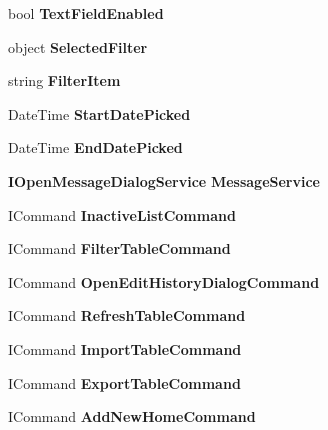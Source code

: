 \begin{DoxyCompactItemize}
\mbox{\label{class_a_f_h___scheduler_1_1_data_v_m_a2e6eb006502aeaff72ad2cb226d83679}} 
bool {\bfseries Text\+Field\+Enabled}\hspace{0.3cm}{\ttfamily  [get, set]}
\item 
\mbox{\label{class_a_f_h___scheduler_1_1_data_v_m_a5326e462e8c421bfda77f64aecdefbe7}} 
object {\bfseries Selected\+Filter}\hspace{0.3cm}{\ttfamily  [get, set]}
\item 
\mbox{\label{class_a_f_h___scheduler_1_1_data_v_m_aa6ab63cf7adfba8c43952d6a47a7331d}} 
string {\bfseries Filter\+Item}\hspace{0.3cm}{\ttfamily  [get, set]}
\item 
\mbox{\label{class_a_f_h___scheduler_1_1_data_v_m_a12e84d60a08a2e5265e0edeaff493b61}} 
Date\+Time {\bfseries Start\+Date\+Picked}\hspace{0.3cm}{\ttfamily  [get, set]}
\item 
\mbox{\label{class_a_f_h___scheduler_1_1_data_v_m_ac54549484cb30704dad4fe5fe0de7ea6}} 
Date\+Time {\bfseries End\+Date\+Picked}\hspace{0.3cm}{\ttfamily  [get, set]}
\item 
\mbox{\label{class_a_f_h___scheduler_1_1_data_v_m_a7dd9dc4cbc3ba84a25ab57f7dad05914}} 
\textbf{ I\+Open\+Message\+Dialog\+Service} {\bfseries Message\+Service}\hspace{0.3cm}{\ttfamily  [get]}
\item 
\mbox{\label{class_a_f_h___scheduler_1_1_data_v_m_abc31bbd44c3a8818c3529a6f3a0b3b57}} 
I\+Command {\bfseries Inactive\+List\+Command}\hspace{0.3cm}{\ttfamily  [get]}
\item 
\mbox{\label{class_a_f_h___scheduler_1_1_data_v_m_a405f94127fe3f9fd66a4d55bf05161c9}} 
I\+Command {\bfseries Filter\+Table\+Command}\hspace{0.3cm}{\ttfamily  [get]}
\item 
\mbox{\label{class_a_f_h___scheduler_1_1_data_v_m_aef12b4f9b73765ebe995e698eeaaea80}} 
I\+Command {\bfseries Open\+Edit\+History\+Dialog\+Command}\hspace{0.3cm}{\ttfamily  [get]}
\item 
\mbox{\label{class_a_f_h___scheduler_1_1_data_v_m_ab37e5b03f1f7f5aa57e23b6d8f43a54f}} 
I\+Command {\bfseries Refresh\+Table\+Command}\hspace{0.3cm}{\ttfamily  [get]}
\item 
\mbox{\label{class_a_f_h___scheduler_1_1_data_v_m_aa936032c7510ea0426d153b813b37270}} 
I\+Command {\bfseries Import\+Table\+Command}\hspace{0.3cm}{\ttfamily  [get]}
\item 
\mbox{\label{class_a_f_h___scheduler_1_1_data_v_m_a09ed8f8aa85404dc8db03755684ea9d4}} 
I\+Command {\bfseries Export\+Table\+Command}\hspace{0.3cm}{\ttfamily  [get]}
\item 
\mbox{\label{class_a_f_h___scheduler_1_1_data_v_m_a4a2668c236f5a75374eed295b08e176c}} 
I\+Command {\bfseries Add\+New\+Home\+Command}\hspace{0.3cm}{\ttfamily  [get]}
\end{DoxyCompactItemize}
